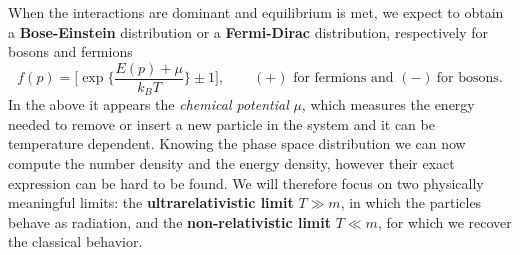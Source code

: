 When the interactions are dominant and equilibrium is met, we expect to obtain a \textbf{Bose-Einstein} distribution or a \textbf{Fermi-Dirac} distribution, respectively for bosons and fermions
\begin{equation}
    \label{eq:BE_FD_distributions}
    f(p)=\bigg[\exp\bigg\{\frac{E(p)+\mu}{k_BT}\bigg\}\pm1\bigg],\qquad (+) \text{ for fermions and } (-)\ \text{for bosons.}
\end{equation}
In the above it appears the \emph{chemical potential} $\mu$, which measures the energy needed to remove or insert a new particle in the system and it can be temperature dependent. Knowing the phase space distribution we can now compute the number density and the energy density, however their exact expression can be hard to be found. We will therefore focus on two physically meaningful limits: the \textbf{ultrarelativistic limit} $T\gg m$, in which the particles behave as radiation, and the \textbf{non-relativistic limit } $T\ll m$, for which we recover the classical behavior.
